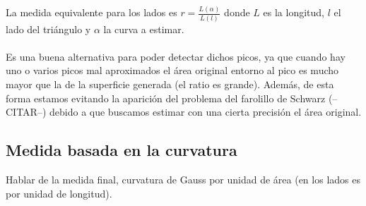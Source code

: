 	La medida equivalente para los lados es $r=\frac{L(\alpha)} {L(l)}$ donde $L$ es la longitud, $l$ el lado del triángulo y $\alpha$ la curva a estimar.\\
	\\Es una buena alternativa para poder detectar dichos picos, ya que cuando hay uno o varios picos mal aproximados el área original entorno al pico es mucho mayor que la de la superficie generada (el ratio es grande). Además, de esta forma estamos evitando la aparición del problema del farolillo de Schwarz (--CITAR--) debido a que buscamos estimar con una cierta precisión el área original.
	
	\subsection{Medida basada en la curvatura}
	Hablar de la medida final, curvatura de Gauss por unidad de área (en los lados es por unidad de longitud).\\
	

\endinput
